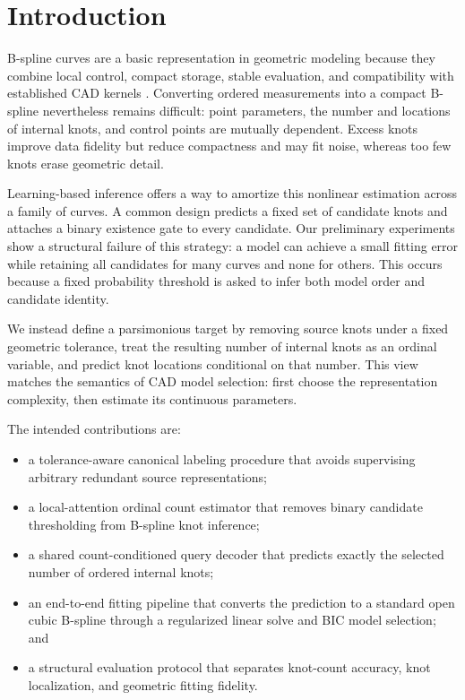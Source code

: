 \section{Introduction}
\label{sec:introduction}

B-spline curves are a basic representation in geometric modeling because they
combine local control, compact storage, stable evaluation, and compatibility
with established CAD kernels \cite{deboor1972,cox1972,piegl1997}. Converting
ordered measurements into a compact B-spline nevertheless remains difficult:
point parameters, the number and locations of internal knots, and control points
are mutually dependent. Excess knots improve data fidelity but reduce
compactness and may fit noise, whereas too few knots erase geometric detail.

Learning-based inference offers a way to amortize this nonlinear estimation
across a family of curves. A common design predicts a fixed set of candidate
knots and attaches a binary existence gate to every candidate. Our preliminary
experiments show a structural failure of this strategy: a model can achieve a
small fitting error while retaining all candidates for many curves and none for
others. This occurs because a fixed probability threshold is asked to infer
both model order and candidate identity.

We instead define a parsimonious target by removing source knots under a fixed
geometric tolerance, treat the resulting number of internal knots as an ordinal
variable, and predict knot locations conditional on that number. This view
matches the semantics of CAD model selection: first choose the representation
complexity, then estimate its continuous parameters.

The intended contributions are:
\begin{itemize}
  \item a tolerance-aware canonical labeling procedure that avoids supervising
  arbitrary redundant source representations;
  \item a local-attention ordinal count estimator that removes binary candidate
  thresholding from B-spline knot inference;
  \item a shared count-conditioned query decoder that predicts exactly the
  selected number of ordered internal knots;
  \item an end-to-end fitting pipeline that converts the prediction to a
  standard open cubic B-spline through a regularized linear solve and BIC model
  selection; and
  \item a structural evaluation protocol that separates knot-count accuracy,
  knot localization, and geometric fitting fidelity.
\end{itemize}

